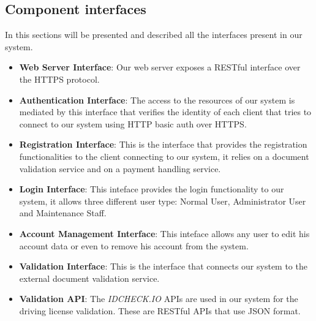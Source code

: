 \subsection{Component interfaces}
In this sections will be presented and described all the interfaces present in
our system.

\begin{itemize}
  \item \textbf{Web Server Interface}: Our web server exposes a RESTful
                                       interface over the HTTPS protocol.
  \item \textbf{Authentication Interface}: The access to the resources of our
                                           system is mediated by this interface
                                           that verifies the identity of each
                                           client that tries to connect to our
                                           system using HTTP basic auth over
                                           HTTPS.
  \item \textbf{Registration Interface}: This is the interface that provides
                                         the registration functionalities to the
                                         client connecting to our system, it
                                         relies on a document validation service
                                         and on a payment handling service.
  \item \textbf{Login Interface}: This inteface provides the login
                                  functionality to our system, it allows three
                                  different user type: Normal User,
                                  Administrator User and Maintenance Staff.
  \item \textbf{Account Management Interface}: This inteface allows any user to
                                               edit his account data or even to
                                               remove his account from the
                                               system.
  \item \textbf{Validation Interface}: This is the interface that connects our
                                       system to the external document
                                       validation service.
  \item \textbf{Validation API}: The \textit{IDCHECK.IO} APIs are used in our
                                 system for the driving license validation.
                                 These are RESTful APIs that use JSON format.

\end{itemize}

